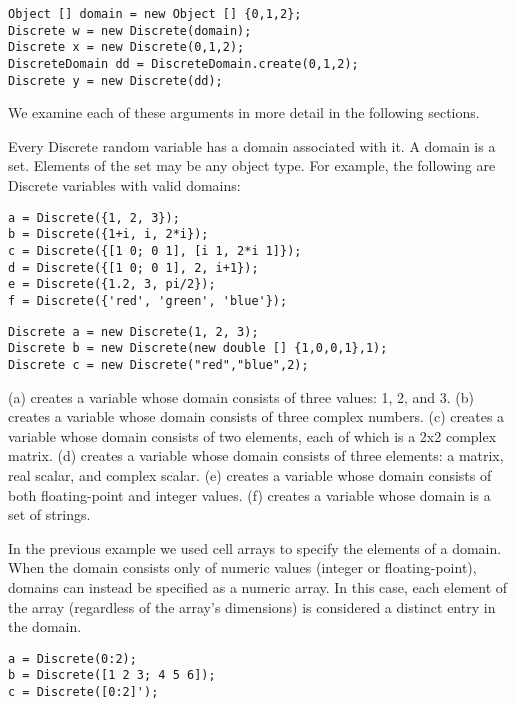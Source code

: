 \ifjava
\begin{lstlisting}
Object [] domain = new Object [] {0,1,2};
Discrete w = new Discrete(domain);
Discrete x = new Discrete(0,1,2);
DiscreteDomain dd = DiscreteDomain.create(0,1,2);
Discrete y = new Discrete(dd);
\end{lstlisting}
\fi

We examine each of these arguments in more detail in the following sections.

\label{Discrete.Domain}

Every Discrete random variable has a domain associated with it.  A domain is a set.  Elements of the set may be any object type.  For example, the following are Discrete variables with valid domains:

\ifmatlab
\begin{lstlisting}
a = Discrete({1, 2, 3});
b = Discrete({1+i, i, 2*i});
c = Discrete({[1 0; 0 1], [i 1, 2*i 1]});
d = Discrete({[1 0; 0 1], 2, i+1});
e = Discrete({1.2, 3, pi/2});
f = Discrete({'red', 'green', 'blue'});
\end{lstlisting}
\fi

\ifjava
\begin{lstlisting}
Discrete a = new Discrete(1, 2, 3);
Discrete b = new Discrete(new double [] {1,0,0,1},1); 
Discrete c = new Discrete("red","blue",2);
\end{lstlisting}
\fi

\ifmatlab
(a) creates a variable whose domain consists of three values: 1, 2, and 3.  (b) creates a variable whose domain consists of three complex numbers.  (c) creates a variable whose domain consists of two elements, each of which is a 2x2 complex matrix.  (d) creates a variable whose domain consists of three elements: a matrix, real scalar, and complex scalar.  (e) creates a variable whose domain consists of both floating-point and integer values.  (f) creates a variable whose domain is a set of strings.

In the previous example we used cell arrays to specify the elements of a domain.  When the domain consists only of numeric values (integer or floating-point), domains can instead be specified as a numeric array.  In this case, each element of the array (regardless of the array's dimensions) is considered a distinct entry in the domain.

\begin{lstlisting}
a = Discrete(0:2);
b = Discrete([1 2 3; 4 5 6]);
c = Discrete([0:2]');
\end{lstlisting}

